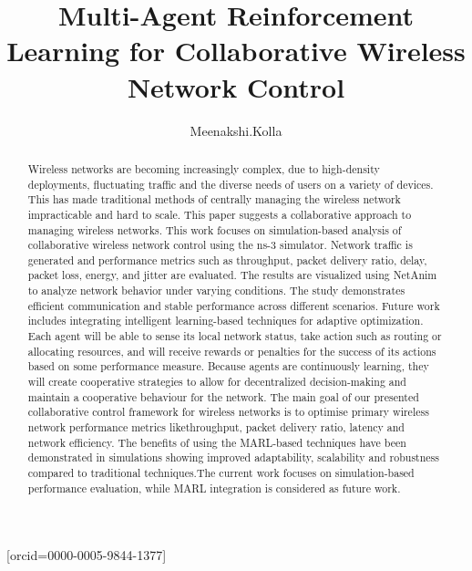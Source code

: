 \documentclass[a4paper,fleqn]{cas-dc}
\numberwithin{equation}{section}
\begin{document}
\let\WriteBookmarks\relax
\def\floatpagepagefraction{1}
\def\textpagefraction{.001}


\title [mode = title]{Multi-Agent Reinforcement Learning for Collaborative Wireless Network Control}                      



\author[1]{Meenakshi.Kolla}[orcid=0000-0005-9844-1377]
\address[1]{School of Computer Science and Engineering, VIT-AP University, Amaravathi. Andhra Pradesh, India}





\begin{abstract}
Wireless networks are becoming increasingly complex, due to high-density deployments, fluctuating traffic and the diverse needs of users on a variety of devices. This has made traditional methods of centrally managing the wireless network impracticable and hard to scale.
This paper suggests a collaborative approach to managing wireless networks. This work focuses on simulation-based analysis of collaborative wireless network control using the ns-3 simulator. Network traffic is generated and performance metrics such as throughput, packet delivery ratio, delay, packet loss, energy, and jitter are evaluated. The results are visualized using NetAnim to analyze network behavior under varying conditions. The study demonstrates efficient communication and stable performance across different scenarios. Future work includes integrating intelligent learning-based techniques for adaptive optimization.
Each agent will be able to sense its local network status, take action such as routing or allocating resources, and will receive rewards or penalties for the success of its actions based on some performance measure. Because agents are continuously learning, they will create cooperative strategies to allow for decentralized decision-making and maintain a cooperative behaviour for the network.
The main goal of our presented collaborative control framework for wireless networks is to optimise primary wireless network performance metrics likethroughput, packet delivery ratio, latency and network efficiency. The benefits of using the MARL-based techniques have been demonstrated in simulations showing improved adaptability, scalability and robustness compared to traditional techniques.The current work focuses on simulation-based performance evaluation, while MARL integration is considered as future work.
\end{abstract}
\end{document}

